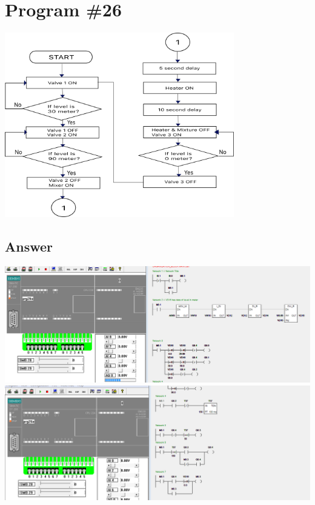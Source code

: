 \documentclass[
	12pt, %
]{fphw}
\begin{document}
\section*{Program \#26}
\begin{problem}
  \begin{center}
    \includegraphics[width = 100mm, scale = 0.9]{heat_mix_1.png}
  \end{center}
  \end{problem}
 \subsection*{Answer}
   \begin{center}
   \includegraphics[width = 165mm, scale =0.9]{prg26a1.png}
   \includegraphics[width = 165mm, scale =0.9]{prg26a2.png}
   \end{center}
    
\end{document}
